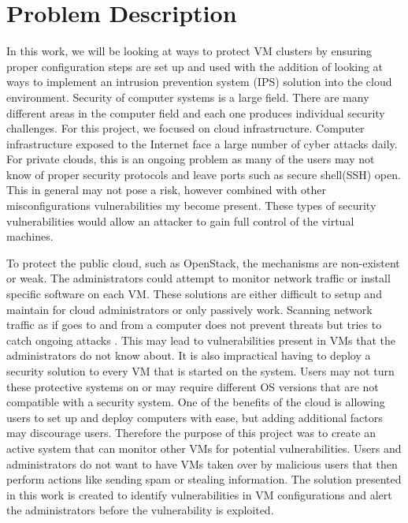 \documentclass[12pt]{article}
\begin{document}
\section{Problem Description}
In this work, we will be looking at ways to protect VM clusters by ensuring proper configuration steps are set up and used with the addition of looking at ways to implement an intrusion prevention system (IPS) solution into the cloud environment. Security of computer systems is a large field. There are many different areas in the computer field and each one produces individual security challenges. For this project, we focused on cloud infrastructure. Computer infrastructure exposed to the Internet face a large number of cyber attacks daily\cite{cimpanu_2017}. For private clouds, this is an ongoing problem as many of the users may not know of proper security protocols and leave ports such as secure shell(SSH) open. This in general may not pose a risk, however combined with other misconfigurations vulnerabilities my become present. These types of security vulnerabilities would allow an attacker to gain full control of the virtual machines.

To protect the public cloud, such as OpenStack, the mechanisms are non-existent or weak. The administrators could attempt to monitor network traffic or install specific software on each VM. These solutions are either difficult to setup and maintain for cloud administrators or only passively work. Scanning network traffic as if goes to and from a computer does not prevent threats but tries to catch ongoing attacks \cite{webster2006experience}. This may lead to vulnerabilities present in VMs that the administrators do not know about. It is also impractical having to deploy a security solution to every VM that is started on the system. Users may not turn these protective systems on or may require different OS versions that are not compatible with a security system. One of the benefits of the cloud is allowing users to set up and deploy computers with ease, but adding additional factors may discourage users. Therefore the purpose of this project was to create an active system that can monitor other VMs for potential vulnerabilities. Users and administrators do not want to have VMs taken over by malicious users that then perform actions like sending spam or stealing information. The solution presented in this work is created to identify vulnerabilities in VM configurations and alert the administrators before the vulnerability is exploited.
\end{document}
